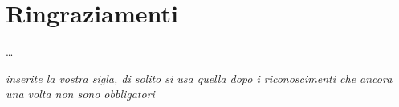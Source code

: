 \chapter*{Ringraziamenti}
\ldots

\addvspace{5em}
\begin{flushright}
\textit{inserite la vostra sigla, di solito si usa quella dopo i riconoscimenti che ancora una volta non sono obbligatori}
\end{flushright}